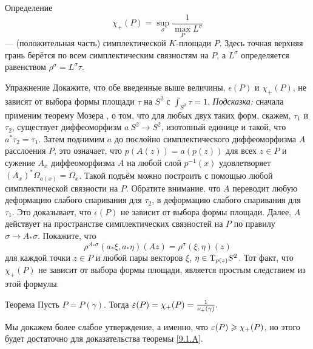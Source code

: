 \begin{ex*}{Определение}
  \[\chi_+ (P) = \sup_\sigma \frac1{\max_P L^\sigma}\]
  --- (положительная часть) симплектической $K$-площади $P$.
  Здесь точная верхняя грань берётся по всем симплектическим
  связностям на $P$, а $L^\sigma$ определяется равенством $\rho^\sigma
  = L^\sigma \tau$.
\end{ex*}

\begin{ex*}{Упражнение}
Докажите, что обе введенные выше величины, $\epsilon(P)$ и $\chi_+
(P)$, не зависят от выбора формы площади $\tau$ на $S^2$ с $\int_{S^2}
\tau = 1$. 
\emph{Подсказка:} сначала применим теорему Мозера \cite{MS}, о том, что для
любых двух таких форм, скажем, $\tau_1$ и $\tau_2$, существует
диффеоморфизм $a\:S^2\to S^2$, изотопный единице и такой, что $a^\ast
\tau_2 = \tau_1$.
Затем поднимим $a$ до послойно симплектического диффеоморфизма $A$
расслоения $P$, это означает, что $p(A(z)) = a(p(z))$ для всех $z \in
P$ и сужение $A_x$ диффеоморфизма $A$ на любой слой $p^{-1} (x)$
удовлетворяет $(A_x)^\ast \Omega_{a(x)} = \Omega_x$.
Такой подъём можно построить с помощью любой симплектической связности
на $P$. 
Обратите внимание, что $A$ переводит любую деформацию слабого
спаривания для $\tau_2$, в деформацию слабого спаривания для
$\tau_1$.
Это доказывает, что $\epsilon(P)$ не зависит от выбора формы площади.
Далее, $A$ действует на пространстве симплектических связностей на $P$
по правилу $\sigma \to A_\ast \sigma$.
Покажите, что 
\[\rho^{A_\ast \sigma} (a_\ast \xi, a_\ast \eta)(Az) = \rho^\sigma (\xi, \eta)(z)\]
для каждой точки $z \in P$ и любой пары векторов $\xi$, $\eta \in
\mathrm{T}_{p(z)} S^2$.
Тот факт, что $\chi_+(P)$ не зависит от выбора формы площади, является
простым следствием из этой формулы.
\end{ex*}

\begin{thm}[(\cite{P4})]{Теорема}\label{9.3.B}
  Пусть $P = P(\gamma)$.
  Тогда $\epsilon(P) = \chi_+ (P) \z= \frac1{\nu_+(\gamma)}.$
\end{thm}

Мы докажем более слабое утверждение, а именно, что $\epsilon(P) \z\ge
\chi_+ (P)$, но этого будет достаточно для доказательства теоремы
\ref{9.1.A}.

